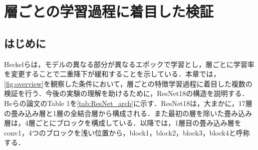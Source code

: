\chapter{層ごとの学習過程に着目した検証}
\section{はじめに}
Heckelらは，モデルの異なる部分が異なるエポックで学習とし，層ごとに学習率を変更することで二重降下が緩和することを示している\cite{Heckel}．本章では，\cref{fig:overview}を観察した条件において，層ごとの特徴学習過程に着目した複数の検証を行う．今後の実験の理解を助けるために，ResNet18の構造を説明する．Heらの論文のTable 1を\cref{tab:ResNet_arch}に示す．ResNet18は，大まかに，17層の畳み込み層と1層の全結合層から構成される．また最初の層を除いた畳み込み層は，4層ごとにブロックを構成している．以降では，1層目の畳み込み層をconv1，4つのブロックを浅い位置から，block1，block2，block3，block4と呼称する．

